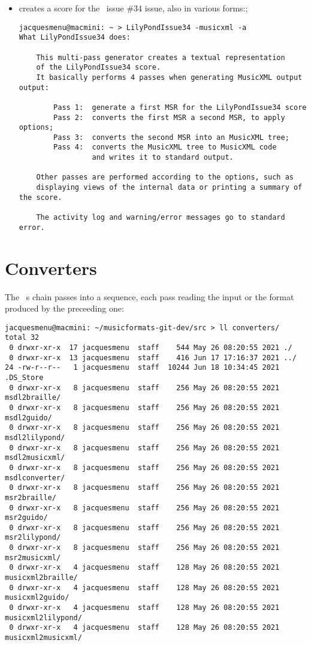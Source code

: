 \begin{itemize}
\item {}
			creates a score for the \lily\ issue \#34 issue, also in various forms:;
\begin{lstlisting}[language=Terminal]
jacquesmenu@macmini: ~ > LilyPondIssue34 -musicxml -a
What LilyPondIssue34 does:

    This multi-pass generator creates a textual representation
    of the LilyPondIssue34 score.
    It basically performs 4 passes when generating MusicXML output output:

        Pass 1:  generate a first MSR for the LilyPondIssue34 score
        Pass 2:  converts the first MSR a second MSR, to apply options;
        Pass 3:  converts the second MSR into an MusicXML tree;
        Pass 4:  converts the MusicXML tree to MusicXML code
                 and writes it to standard output.

    Other passes are performed according to the options, such as
    displaying views of the internal data or printing a summary of the score.

    The activity log and warning/error messages go to standard error.
\end{lstlisting}
\end{itemize}


\section{Converters}

The \mf\ \converter s chain passes into a sequence, each pass reading the input or the format produced by the preceeding one:
\begin{lstlisting}[language=Terminal]
jacquesmenu@macmini: ~/musicformats-git-dev/src > ll converters/
total 32
 0 drwxr-xr-x  17 jacquesmenu  staff    544 May 26 08:20:55 2021 ./
 0 drwxr-xr-x  13 jacquesmenu  staff    416 Jun 17 17:16:37 2021 ../
24 -rw-r--r--   1 jacquesmenu  staff  10244 Jun 18 10:34:45 2021 .DS_Store
 0 drwxr-xr-x   8 jacquesmenu  staff    256 May 26 08:20:55 2021 msdl2braille/
 0 drwxr-xr-x   8 jacquesmenu  staff    256 May 26 08:20:55 2021 msdl2guido/
 0 drwxr-xr-x   8 jacquesmenu  staff    256 May 26 08:20:55 2021 msdl2lilypond/
 0 drwxr-xr-x   8 jacquesmenu  staff    256 May 26 08:20:55 2021 msdl2musicxml/
 0 drwxr-xr-x   8 jacquesmenu  staff    256 May 26 08:20:55 2021 msdlconverter/
 0 drwxr-xr-x   8 jacquesmenu  staff    256 May 26 08:20:55 2021 msr2braille/
 0 drwxr-xr-x   8 jacquesmenu  staff    256 May 26 08:20:55 2021 msr2guido/
 0 drwxr-xr-x   8 jacquesmenu  staff    256 May 26 08:20:55 2021 msr2lilypond/
 0 drwxr-xr-x   8 jacquesmenu  staff    256 May 26 08:20:55 2021 msr2musicxml/
 0 drwxr-xr-x   4 jacquesmenu  staff    128 May 26 08:20:55 2021 musicxml2braille/
 0 drwxr-xr-x   4 jacquesmenu  staff    128 May 26 08:20:55 2021 musicxml2guido/
 0 drwxr-xr-x   4 jacquesmenu  staff    128 May 26 08:20:55 2021 musicxml2lilypond/
 0 drwxr-xr-x   4 jacquesmenu  staff    128 May 26 08:20:55 2021 musicxml2musicxml/
\end{lstlisting}



